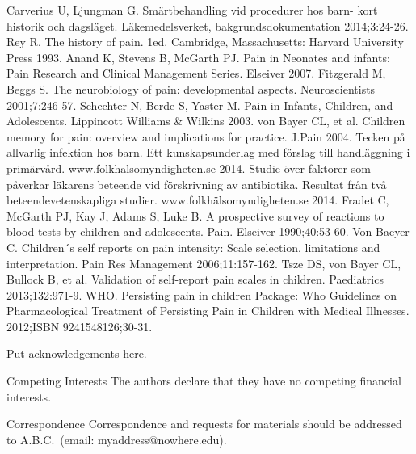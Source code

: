 \documentclass[12pt,twocolumn]{article}
\begin{document}
\newpage
\onecolumn

\begin{thebibliography}{1}
 Carverius U, Ljungman G. Sm\"artbehandling vid procedurer
hos barn- kort historik och dagsl\"aget. L\"akemedelsverket, bakgrundsdokumentation 2014;3:24-26. 
 Rey R. The history of pain. 1ed. Cambridge, Massachusetts:
Harvard University Press 1993.
Anand K, Stevens B, McGarth PJ. Pain in Neonates and infants:
Pain Research and Clinical Management Series. Elseiver 2007.
Fitzgerald M, Beggs S. The neurobiology of pain:
developmental aspects. Neuroscientists         2001;7:246-57.
 Schechter N, Berde S, Yaster M. Pain in Infants,
Children, and Adolescents. Lippincott Williams \& Wilkins 2003.
 von Bayer CL, et al. Children memory for pain: overview and implications for practice. J.Pain 2004.
 Tecken p\r{a} allvarlig infektion hos barn. Ett kunskapsunderlag med f\"orslag till handl\"aggning i prim\"arv\r{a}rd. www.folkhalsomyndigheten.se 2014.
 Studie \"over faktorer som p\r{a}verkar l\"akarens beteende vid f\"orskrivning av antibiotika. Resultat fr\r{a}n tv\r{a} beteendevetenskapliga studier. www.folkh\"alsomyndigheten.se 2014.
 Fradet C, McGarth PJ, Kay J, Adams S, Luke B. A prospective survey of reactions to blood        tests by children and adolescents. Pain. Elseiver 1990;40:53-60.
 Von Baeyer C.    Children´s self reports on pain intensity: Scale selection, limitations and            interpretation. Pain Res Management 2006;11:157-162.
 Tsze DS, von Bayer CL, Bullock B, et al. Validation of self-report pain scales in children.     Paediatrics 2013;132:971-9.
 WHO. Persisting pain in children Package: Who Guidelines on Pharmacological Treatment   of Persisting Pain in Children with Medical Illnesses. 2012;ISBN 9241548126;30-31.

\end{thebibliography}



\begin{addendum}
 \item Put acknowledgements here.
 \item[Competing Interests] The authors declare that they have no
competing financial interests.
 \item[Correspondence] Correspondence and requests for materials
should be addressed to A.B.C.~(email: myaddress@nowhere.edu).
\end{addendum}

\end{document}
